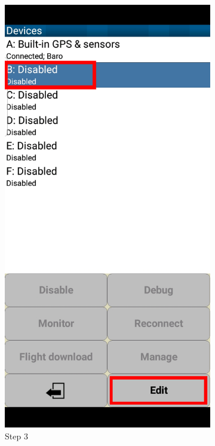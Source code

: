 \documentclass{article}
\begin{document}
\begin{figure}[h!]
\begin{subfigure}[b]{0.24\linewidth}
            \includegraphics[width=\linewidth]{images/Tophat-3.jpg}
            \caption{Step 3}
        \end{subfigure}
        \begin{subfigure}[b]{0.24\linewidth}

\end{subfigure}
\end{figure}
\end{document}
